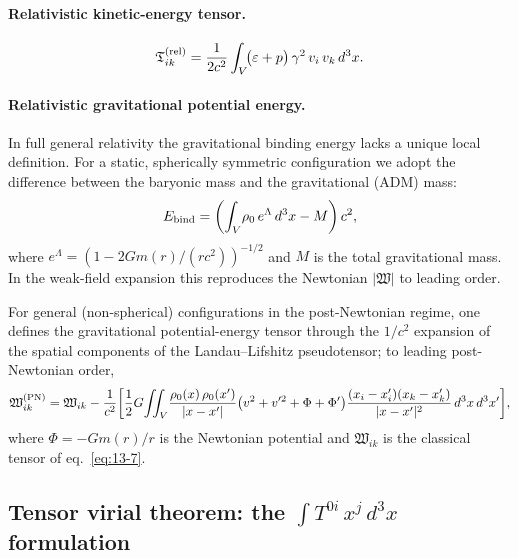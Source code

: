 \paragraph{Relativistic kinetic-energy tensor.}
\begin{equation}
\label{eq:rel-13-Tik}
\mathfrak{T}_{ik}^{(\mathrm{rel})}
  = \frac{1}{2c^{2}}\int_{V}\!
    \bigl(\varepsilon + p\bigr)\,\gamma^{2}\,v_{i}\,v_{k}\,d^{3}x.
\end{equation}

\paragraph{Relativistic gravitational potential energy.}
In full general relativity the gravitational binding energy lacks a
unique local definition.  For a static, spherically symmetric
configuration we adopt the difference between the baryonic mass and
the gravitational (ADM) mass:
\begin{equation}
\label{eq:rel-13-Wbinding}
E_{\mathrm{bind}} = \left(\int_{V}\!\rho_0\,
  e^{\Lambda}\,d^{3}x - M\right) c^{2},
\end{equation}
where $e^{\Lambda} = (1 - 2Gm(r)/(rc^{2}))^{-1/2}$ and $M$ is the
total gravitational mass.  In the weak-field expansion this reproduces
the Newtonian $|\mathfrak{W}|$ to leading order.

For general (non-spherical) configurations in the post-Newtonian
regime, one defines the gravitational potential-energy tensor through
the $1/c^{2}$ expansion of the spatial components of the
Landau--Lifshitz pseudotensor; to leading post-Newtonian order,
\begin{equation}
\label{eq:rel-13-Wik-PN}
\mathfrak{W}_{ik}^{(\mathrm{PN})}
  = \mathfrak{W}_{ik}
  - \frac{1}{c^{2}}\biggl[
      \frac{1}{2}G\!\iint_{V}\!
        \frac{\rho_0(x)\,\rho_0(x')}
             {|x-x'|}
        \bigl(v^{2} + v'^{2} + \Phi + \Phi'\bigr)
        \frac{(x_{i}-x_{i}')(x_{k}-x_{k}')}{|x-x'|^{2}}
        \,d^{3}x\,d^{3}x'
    \biggr],
\end{equation}
where $\Phi = -Gm(r)/r$ is the Newtonian potential and
$\mathfrak{W}_{ik}$ is the classical tensor of eq.~\eqref{eq:13-7}.


\subsection{Tensor virial theorem: the \texorpdfstring{$\int T^{0i}\,x^{j}\,d^{3}x$}{integral T0i xj}
  formulation}
\label{sec:rel-117-tensor}

